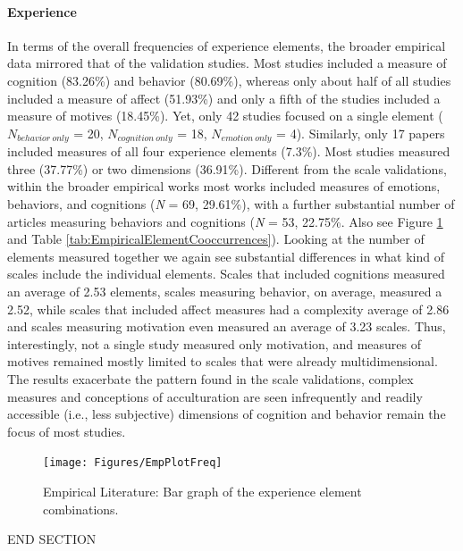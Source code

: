 \paragraph{Experience}

In terms of the overall frequencies of experience elements, the broader
empirical data mirrored that of the validation studies. Most studies
included a measure of cognition (83.26\%) and behavior (80.69\%),
whereas only about half of all studies included a measure of affect
(51.93\%) and only a fifth of the studies included a measure of motives
(18.45\%). Yet, only 42 studies focused on a single element
(\(N_{behavior\ only}\) = 20, \(N_{cognition\ only}\) = 18,
\(N_{emotion\ only}\) = 4). Similarly, only 17 papers included measures
of all four experience elements (7.3\%). Most studies measured three
(37.77\%) or two dimensions (36.91\%). Different from the scale
validations, within the broader empirical works most works included
measures of emotions, behaviors, and cognitions (\textit{N} = 69,
29.61\%), with a further substantial number of articles measuring
behaviors and cognitions (\textit{N} = 53, 22.75\%. Also see Figure
\ref{fig:EmpPlotFreq-1} and Table
\ref{tab:EmpiricalElementCooccurrences}). Looking at the number of
elements measured together we again see substantial differences in what
kind of scales include the individual elements. Scales that included
cognitions measured an average of 2.53 elements, scales measuring
behavior, on average, measured a 2.52, while scales that included affect
measures had a complexity average of 2.86 and scales measuring
motivation even measured an average of 3.23 scales. Thus, interestingly,
not a single study measured only motivation, and measures of motives
remained mostly limited to scales that were already multidimensional.
The results exacerbate the pattern found in the scale validations,
complex measures and conceptions of acculturation are seen infrequently
and readily accessible (i.e., less subjective) dimensions of cognition
and behavior remain the focus of most studies.

\begin{figure}[h]
\centering
\caption{Empirical Literature: Bar graph of the experience element combinations.}
\texttt{[image: Figures/EmpPlotFreq]}
\label{fig:EmpPlotFreq-1}
\end{figure}



\vspace{1em}

END SECTION
